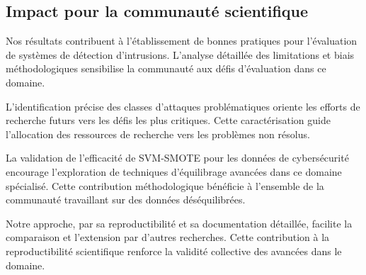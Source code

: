 \subsection{Impact pour la communauté scientifique}

Nos résultats contribuent à l'établissement de bonnes pratiques pour l'évaluation de systèmes de détection d'intrusions. L'analyse détaillée des limitations et biais méthodologiques sensibilise la communauté aux défis d'évaluation dans ce domaine.

L'identification précise des classes d'attaques problématiques oriente les efforts de recherche futurs vers les défis les plus critiques. Cette caractérisation guide l'allocation des ressources de recherche vers les problèmes non résolus.

La validation de l'efficacité de SVM-SMOTE pour les données de cybersécurité encourage l'exploration de techniques d'équilibrage avancées dans ce domaine spécialisé. Cette contribution méthodologique bénéficie à l'ensemble de la communauté travaillant sur des données déséquilibrées.

Notre approche, par sa reproductibilité et sa documentation détaillée, facilite la comparaison et l'extension par d'autres recherches. Cette contribution à la reproductibilité scientifique renforce la validité collective des avancées dans le domaine.

\newpage